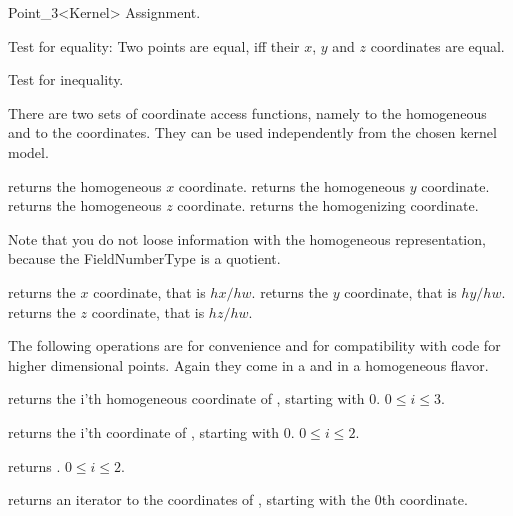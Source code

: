\begin{ccRefClass} {Point_3<Kernel>}
\ccHidden {}
        {Assignment.}

       {Test for equality: Two points are equal, iff their $x$, $y$ and $z$
        coordinates are equal.}

       {Test for inequality.}

There are two sets of coordinate access functions, namely to the
homogeneous and to the  coordinates. They can be used
independently from the chosen kernel model.

       {returns the homogeneous $x$ coordinate.}
\ccGlue
{}
       {returns the homogeneous $y$ coordinate.}
\ccGlue
{}
       {returns the homogeneous $z$ coordinate.}
\ccGlue
{}
       {returns the homogenizing coordinate.}

Note that you do not loose information with the homogeneous
representation, because the FieldNumberType is a quotient.

       {returns the  $x$ coordinate, that is $hx/hw$.}
\ccGlue
{}
       {returns the  $y$ coordinate, that is $hy/hw$.}
\ccGlue
{}
       {returns the  $z$ coordinate, that is $hz/hw$.}

The following operations are for convenience and for compatibility
with code for higher dimensional points. Again they come in a
 and in a homogeneous flavor.

       {returns the i'th homogeneous coordinate of \ccVar, starting with 0.
        \ccPrecond $0\leq i \leq 3$.}

       {returns the i'th  coordinate of \ccVar, starting with 0.
        \ccPrecond $0\leq i \leq 2$.}

       {returns .
        \ccPrecond $0\leq i \leq 2$.}

       {returns an iterator to the  coordinates 
        of \ccVar, starting with the 0th coordinate.}


\end{ccRefClass}
